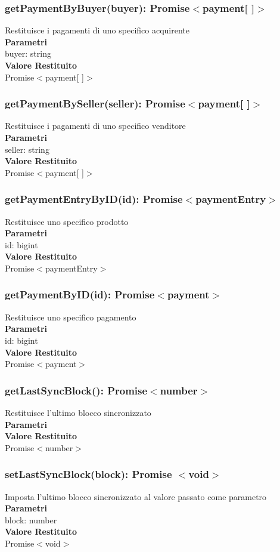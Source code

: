 \documentclass[a4paper, 12pt]{article}
\begin{document}
\subsubsection{getPaymentByBuyer(buyer): Promise$<$payment[ ]$>$}
Restituisce i pagamenti di uno specifico acquirente\\
\textbf{Parametri}\\
buyer: string\\
\textbf{Valore Restituito}\\
Promise$<$payment[ ]$>$
\subsubsection{getPaymentBySeller(seller): Promise$<$payment[ ]$>$}
Restituisce i pagamenti di uno specifico venditore\\
\textbf{Parametri}\\
seller: string\\
\textbf{Valore Restituito}\\
Promise$<$payment[ ]$>$
\subsubsection{getPaymentEntryByID(id): Promise$<$paymentEntry$>$}
Restituisce uno specifico prodotto\\
\textbf{Parametri}\\
id: bigint\\
\textbf{Valore Restituito}\\
Promise$<$paymentEntry$>$
\subsubsection{getPaymentByID(id): Promise$<$payment$>$}
Restituisce uno specifico pagamento\\
\textbf{Parametri}\\
id: bigint\\
\textbf{Valore Restituito}\\
Promise$<$payment$>$
\subsubsection{getLastSyncBlock(): Promise$<$number$>$}
Restituisce l'ultimo blocco sincronizzato\\
\textbf{Parametri}\\
\textbf{Valore Restituito}\\
Promise$<$number$>$
\subsubsection{setLastSyncBlock(block): Promise $<$void$>$}
Imposta l'ultimo blocco sincronizzato al valore passato come parametro\\
\textbf{Parametri}\\
block: number\\
\textbf{Valore Restituito}\\
Promise$<$void$>$
\end{document}
